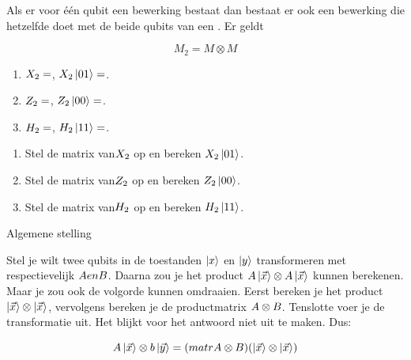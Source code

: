 \documentclass[../main.tex]{subfiles}
\begin{document}
\begin{mdframed}[style=wiskader,frametitle={Matrixen}]
Als er voor \'e\'en qubit een bewerking  bestaat dan bestaat er ook een bewerking  die hetzelfde doet met de beide qubits van een . Er geldt


\[M_2=M \otimes M\]


\begin{antwoord}
\begin{enumerate}
\item $X_2=$, $X_2\ket{01}=$.
\item $Z_2=$, $Z_2\ket{00}=$.
\item $H_2=$, $H_2\ket{11}=$.
\end{enumerate}
\end{antwoord}
\begin{opdracht}
\begin{enumerate}
\item Stel de matrix van$X_2$ op en bereken $X_2\ket{01}$.
\item Stel de matrix van$Z_2$ op en bereken $Z_2\ket{00}$.
\item Stel de matrix van$H_2$ op en bereken $H_2\ket{11}$.
\end{enumerate}
\end{opdracht}
Algemene stelling

Stel je wilt twee qubits in de toestanden $\ket{x}$ en $\ket{y}$ transformeren met respectievelijk $A en B$. Daarna zou je het product $A\ket{\vec{x}} \otimes A\ket{\vec{x}}$ kunnen berekenen. Maar je zou ook de volgorde kunnen omdraaien. Eerst bereken je het product $\ket{\vec{x}} \otimes \ket{\vec{x}}$, vervolgens bereken je de productmatrix $A \otimes B$. Tenslotte voer je de transformatie uit. Het blijkt voor het antwoord niet uit te maken. Dus:

\[A\ket{\vec{x}} \otimes b\ket{\vec{y}} = (matr{A} \otimes B)(\ket{\vec{x}} \otimes \ket{\vec{x}})\]



\end{mdframed}
\end{document}
